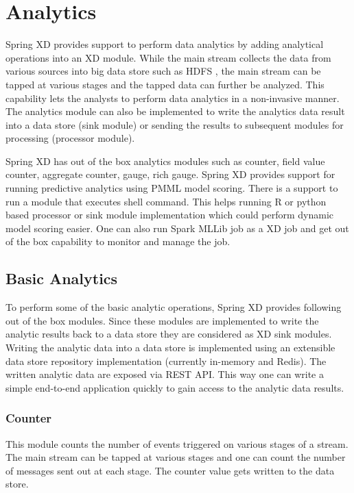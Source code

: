 \section{Analytics}

Spring XD provides support to perform data analytics by adding analytical operations into
an XD module. While the main stream collects the data from various sources into big data
store such as HDFS , the main stream can be tapped at various stages and the tapped data
can further be analyzed. This capability lets the analysts to perform data analytics in a
non-invasive manner. The analytics module can also be implemented to write the analytics
data result into a data store (sink module) or sending the results to subsequent modules
for processing (processor module). 

\par

Spring XD has out of the box analytics modules such as counter, field value counter,
aggregate counter, gauge, rich gauge. Spring XD provides support for running predictive
analytics using PMML model scoring. There is a support to run a module that executes
shell command. This helps running R or python based processor or sink module implementation
 which could perform dynamic model scoring easier. One can also run Spark MLLib job as a
 XD job and get out of the box capability to monitor and manage the job.

\subsection {Basic Analytics}

To perform some of the basic analytic operations, Spring XD provides following out of the
box modules. Since these modules are implemented to write the analytic results back to a
data store they are considered as XD sink modules. Writing the analytic data into a data
store is implemented using an extensible data store repository implementation
(currently in-memory and Redis). The written analytic data are exposed via REST API.
This way one can write a simple end-to-end application quickly to gain access to the
analytic data results.

\subsubsection {Counter}

This module counts the number of events triggered on various stages of a stream.
The main stream can be tapped at various stages and one can count the number of
messages sent out at each stage. The counter value gets written to the data store.
 
